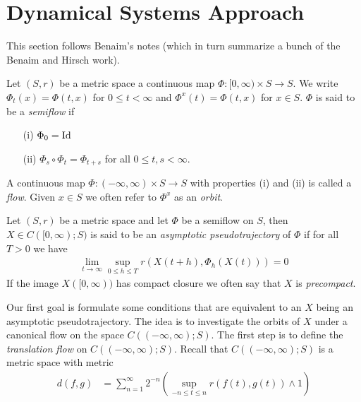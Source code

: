\section{Dynamical Systems Approach}

This section follows Benaim's notes (which in turn summarize a bunch of the Benaim and Hirsch work).

\begin{defn}Let $(S,r)$ be a metric space a continuous map $\Phi : [0,\infty) \times S \to S$. We write $\Phi_t(x) = \Phi(t,x)$ for $0 \leq t < \infty$ and $\Phi^x(t) = \Phi(t,x)$ for $x \in S$.  $\Phi$ is said to be a \emph{semiflow} if 
\begin{itemize}
\item[(i)] $\Phi_0 = \operatorname*{Id}$
\item[(ii)] $\Phi_s \circ \Phi_t = \Phi_{t+s}$ for all $0 \leq t,s < \infty$.
\end{itemize}
A continuous map $\Phi : (-\infty, \infty) \times S \to S$ with properties (i) and (ii) is called a \emph{flow}.  Given $x \in S$ we often refer to $\Phi^x$ as an \emph{orbit}.
\end{defn}

\begin{defn}Let $(S,r)$ be a metric space and let $\Phi$ be a semiflow on $S$, then $X \in C([0,\infty) ; S)$ is said to be an \emph{asymptotic pseudotrajectory} of $\Phi$ if for all $T > 0$ we have 
\begin{align*}
\lim_{t \to \infty} \sup_{0 \leq h \leq T} r(X(t+h), \Phi_h(X(t))) = 0
\end{align*}
If the image $X([0,\infty))$ has compact closure we often say that $X$ is \emph{precompact}.
\end{defn}

Our first goal is formulate some conditions that are equivalent to an $X$ being an asymptotic pseudotrajectory.  The idea is to investigate the orbits of $X$ under a canonical flow on the space $C((-\infty, \infty); S)$.  The first step is to define the \emph{translation flow} on $C((-\infty, \infty); S)$.  Recall that $C((-\infty, \infty); S)$ is a metric space with metric
\begin{align*}
d(f,g) &= \sum_{n=1}^\infty 2^{-n} (\sup_{-n \leq t \leq n} r(f(t), g(t)) \wedge 1)
\end{align*}

